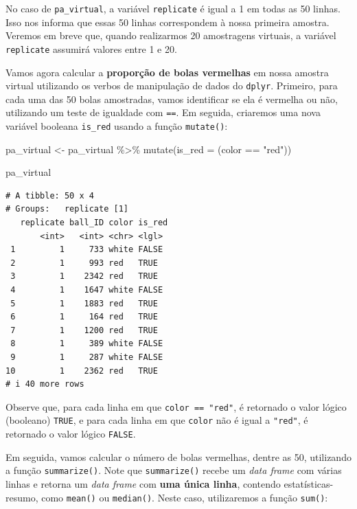 \documentclass[
  letterpaper,
  DIV=11,
  numbers=noendperiod]{scrreprt}
\newenvironment{Shaded}{\begin{snugshade}}{\end{snugshade}}
\newcommand{\AttributeTok}[1]{\textcolor[rgb]{0.40,0.45,0.13}{#1}}
\newcommand{\FunctionTok}[1]{\textcolor[rgb]{0.28,0.35,0.67}{#1}}
\newcommand{\NormalTok}[1]{\textcolor[rgb]{0.00,0.23,0.31}{#1}}
\newcommand{\OtherTok}[1]{\textcolor[rgb]{0.00,0.23,0.31}{#1}}
\newcommand{\SpecialCharTok}[1]{\textcolor[rgb]{0.37,0.37,0.37}{#1}}
\newcommand{\StringTok}[1]{\textcolor[rgb]{0.13,0.47,0.30}{#1}}
\begin{document}
No caso de \texttt{pa\_virtual}, a variável \texttt{replicate} é igual a
1 em todas as 50 linhas. Isso nos informa que essas 50 linhas
correspondem à nossa primeira amostra. Veremos em breve que, quando
realizarmos 20 amostragens virtuais, a variável \texttt{replicate}
assumirá valores entre 1 e 20.

Vamos agora calcular a \textbf{proporção de bolas vermelhas} em nossa
amostra virtual utilizando os verbos de manipulação de dados do
\texttt{dplyr}. Primeiro, para cada uma das 50 bolas amostradas, vamos
identificar se ela é vermelha ou não, utilizando um teste de igualdade
com \texttt{==}. Em seguida, criaremos uma nova variável booleana
\texttt{is\_red} usando a função \texttt{mutate()}:

\begin{Shaded}
\begin{Highlighting}[]
\NormalTok{pa\_virtual }\OtherTok{\textless{}{-}}\NormalTok{ pa\_virtual }\SpecialCharTok{\%\textgreater{}\%}
\FunctionTok{mutate}\NormalTok{(}\AttributeTok{is\_red =}\NormalTok{ (color }\SpecialCharTok{==} \StringTok{"red"}\NormalTok{))}

\NormalTok{pa\_virtual}
\end{Highlighting}
\end{Shaded}

\begin{verbatim}
# A tibble: 50 x 4
# Groups:   replicate [1]
   replicate ball_ID color is_red
       <int>   <int> <chr> <lgl> 
 1         1     733 white FALSE 
 2         1     993 red   TRUE  
 3         1    2342 red   TRUE  
 4         1    1647 white FALSE 
 5         1    1883 red   TRUE  
 6         1     164 red   TRUE  
 7         1    1200 red   TRUE  
 8         1     389 white FALSE 
 9         1     287 white FALSE 
10         1    2362 red   TRUE  
# i 40 more rows
\end{verbatim}

Observe que, para cada linha em que \texttt{color\ ==\ "red"}, é
retornado o valor lógico (booleano) \texttt{TRUE}, e para cada linha em
que \texttt{color} não é igual a \texttt{"red"}, é retornado o valor
lógico \texttt{FALSE}.

Em seguida, vamos calcular o número de bolas vermelhas, dentre as 50,
utilizando a função \texttt{summarize()}. Note que \texttt{summarize()}
recebe um \emph{data frame} com várias linhas e retorna um \emph{data
frame} com \textbf{uma única linha}, contendo estatísticas-resumo, como
\texttt{mean()} ou \texttt{median()}. Neste caso, utilizaremos a função
\texttt{sum()}:
\end{document}

